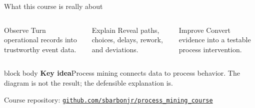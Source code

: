 \documentclass[aspectratio=169,11pt]{beamer}
\newcommand{\keyidea}[1]{%
  \begin{beamercolorbox}[rounded=true,sep=0.65em]{block body}
    \textbf{\color{Teal}Key idea}\quad #1
  \end{beamercolorbox}
}
\begin{document}
\begin{frame}{What this course is really about}
  \begin{columns}[T,onlytextwidth]
      \begin{block}{Observe}
        Turn operational records into trustworthy event data.
      \end{block}
      \begin{block}{Explain}
        Reveal paths, choices, delays, rework, and deviations.
      \end{block}
      \begin{block}{Improve}
        Convert evidence into a testable process intervention.
      \end{block}
  \end{columns}
  \vspace{0.55cm}
  \keyidea{Process mining connects \alert{data} to \alert{process behavior}.
  The diagram is not the result; the defensible explanation is.}
  \vspace{0.3cm}
  \begin{center}
    \small\color{SoftGray}Course repository:\quad
    \href{https://github.com/sbarbonjr/process_mining_course}{\color{Teal}\texttt{github.com/sbarbonjr/process\_mining\_course}}
  \end{center}
\end{frame}
\end{document}
